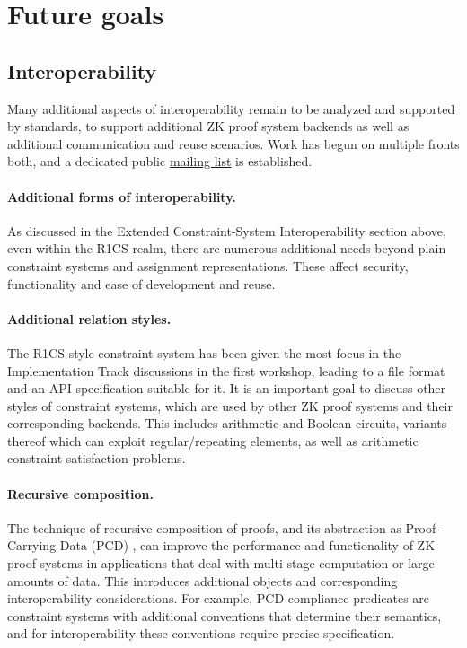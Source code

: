 \section{Future goals}
\label{implem:goals}


\subsection{Interoperability}

Many additional aspects of interoperability remain to be analyzed and supported by standards, to support additional ZK proof system backends as well as additional communication and reuse scenarios. Work has begun on multiple fronts both, and a dedicated public \href{https://groups.google.com/a/zkproof.org/forum/\#!forum/interoperability}{mailing list} is established.

\paragraph{Additional forms of interoperability.}
As discussed in the Extended Constraint-System Interoperability section above, even within the R1CS realm, there are numerous additional needs beyond plain constraint systems and assignment representations. These affect security, functionality and ease of development and reuse.


\paragraph{Additional relation styles.}
The R1CS-style constraint system has been given the most focus in the Implementation Track discussions in the first workshop, leading to a file format and an API specification suitable for it. It is an important goal to discuss other styles of constraint systems, which are used by other ZK proof systems and their corresponding backends. This includes arithmetic and Boolean circuits, variants thereof which can exploit regular/repeating elements, as well as arithmetic constraint satisfaction problems.


\paragraph{Recursive composition.}
The technique of recursive composition of proofs, and its abstraction as Proof-Carrying Data (PCD) 
\cite{2010:ICS:proof-carrying-data,2014:crypto:Scalable-Zero-Knowledge-via-Cycles-of-Elliptic-Curves}, %
can improve the performance and functionality of ZK proof systems in applications that deal with multi-stage computation or large amounts of data. This introduces additional objects and corresponding interoperability considerations. For example, PCD compliance predicates are constraint systems with additional conventions that determine their semantics, and for interoperability these conventions require precise specification.


